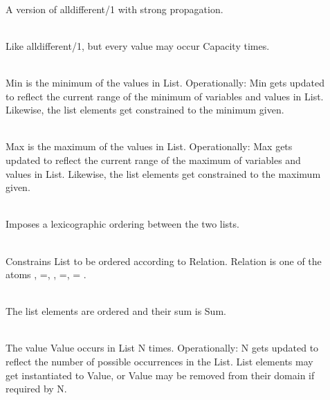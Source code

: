 \begin{description}
\item[]\ \\
A version of alldifferent/1 with strong propagation.

\item[]\ \\
Like alldifferent/1, but every value may occur Capacity times.

\item[]\ \\
Min is the minimum of the values in List.
Operationally: Min gets updated to reflect the current
range of the minimum of variables and values in List.
Likewise, the list elements get constrained to the
minimum given.

\item[]\ \\
Max is the maximum of the values in List.
Operationally: Max gets updated to reflect the current
range of the maximum of variables and values in List.
Likewise, the list elements get constrained to the
maximum given.


\item[]\ \\
Imposes a lexicographic ordering between the two lists.

\item[]\ \\
Constrains List to be ordered according to Relation.
Relation is one of the atoms \lt, =\lt, \gt, \gt=, = .

\item[]\ \\
The list elements are ordered and their sum is Sum.

\item[]\ \\
The value Value occurs in List N times.
Operationally: N gets updated to reflect the number of
possible occurrences in the List. List elements may get
instantiated to Value, or Value may be removed from their
domain if required by N.


\end{description}
